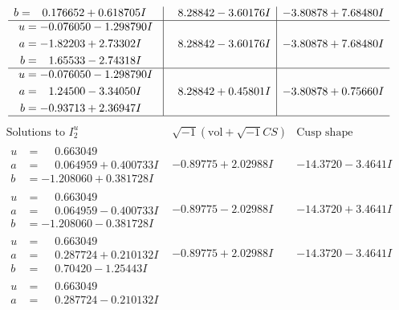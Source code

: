 \documentclass[1p]{elsarticle_modified}
\theoremstyle{definition}
\newcommand{\I}{\sqrt{-1}}
\begin{document}
$$\begin{array}{c|c|c}
\begin{aligned}
b &= \phantom{-}0.176652 + 0.618705 I\end{aligned}
 & \phantom{-}8.28842 - 3.60176 I & -3.80878 + 7.68480 I \\ \hline\begin{aligned}
u &= -0.076050 - 1.298790 I \\
a &= -1.82203 + 2.73302 I \\
b &= \phantom{-}1.65533 - 2.74318 I\end{aligned}
 & \phantom{-}8.28842 - 3.60176 I & -3.80878 + 7.68480 I \\ \hline\begin{aligned}
u &= -0.076050 - 1.298790 I \\
a &= \phantom{-}1.24500 - 3.34050 I \\
b &= -0.93713 + 2.36947 I\end{aligned}
 & \phantom{-}8.28842 + 0.45801 I & -3.80878 + 0.75660 I\\
 \hline 
 \end{array}$$\newpage$$\begin{array}{c|c|c}  
\text{Solutions to }I^u_{2}& \I (\text{vol} + \sqrt{-1}CS) & \text{Cusp shape}\\
 \hline 
\begin{aligned}
u &= \phantom{-}0.663049\phantom{ +0.000000I} \\
a &= \phantom{-}0.064959 + 0.400733 I \\
b &= -1.208060 + 0.381728 I\end{aligned}
 & -0.89775 + 2.02988 I & -14.3720 - 3.4641 I \\ \hline\begin{aligned}
u &= \phantom{-}0.663049\phantom{ +0.000000I} \\
a &= \phantom{-}0.064959 - 0.400733 I \\
b &= -1.208060 - 0.381728 I\end{aligned}
 & -0.89775 - 2.02988 I & -14.3720 + 3.4641 I \\ \hline\begin{aligned}
u &= \phantom{-}0.663049\phantom{ +0.000000I} \\
a &= \phantom{-}0.287724 + 0.210132 I \\
b &= \phantom{-}0.70420 - 1.25443 I\end{aligned}
 & -0.89775 + 2.02988 I & -14.3720 - 3.4641 I \\ \hline\begin{aligned}
u &= \phantom{-}0.663049\phantom{ +0.000000I} \\
a &= \phantom{-}0.287724 - 0.210132 I \\

\end{aligned}
\end{array}$$
\end{document}
